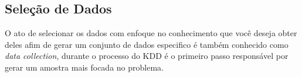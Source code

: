 \subsection{Seleção de Dados}
O ato de selecionar os dados com enfoque no conhecimento que você deseja obter deles afim de gerar um conjunto de dados especifico é também conhecido como \textit{data collection}, durante o processo do KDD é o primeiro passo responsável por gerar um amostra mais focada no problema.
